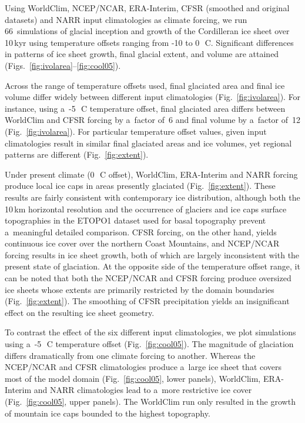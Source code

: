 \documentclass[tc, ms]{copernicus}
\begin{document}
Using WorldClim, NCEP/NCAR, ERA-Interim, CFSR (smoothed and original datasets) and NARR input climatologies as climate forcing, we run 66~simulations of glacial inception and growth of the Cordilleran ice sheet over 10\,kyr using temperature offsets ranging from -10 to 0\,\unit{{\degree}C}. Significant differences in patterns of ice sheet growth, final glacial extent, and volume are attained (Figs.~\ref{fig:ivolarea}--\ref{fig:cool05}).

Across the range of temperature offsets used, final glaciated area and final ice volume differ widely between different input climatologies (Fig.~\ref{fig:ivolarea}). For instance, using a~-5\,\unit{{\degree}C} temperature offset, final glaciated area differs between WorldClim and CFSR forcing by a~factor of~6 and final volume by a~factor of~12 (Fig.~\ref{fig:ivolarea}). For particular temperature offset values, given input climatologies result in similar final glaciated areas and ice volumes, yet regional patterns are different (Fig.~\ref{fig:extent}).

Under present climate (0\,\unit{{\degree}C} offset), WorldClim, ERA-Interim and NARR forcing produce local ice caps in areas presently glaciated (Fig.~\ref{fig:extent}). These results are fairly consistent with contemporary ice distribution, although both the 10\,\unit{km} horizontal resolution and the occurrence of glaciers and ice caps surface topographies in the ETOPO1 dataset used for basal topography prevent a~meaningful detailed comparison. CFSR forcing, on the other hand, yields continuous ice cover over the northern Coast Mountains, and NCEP/NCAR forcing results in ice sheet growth, both of which are largely inconsistent with the present state of glaciation. At the opposite side of the temperature offset range, it can be noted that both the NCEP/NCAR and CFSR forcing produce oversized ice sheets whose extents are primarily restricted by the domain boundaries (Fig.~\ref{fig:extent}). The smoothing of CFSR precipitation yields an insignificant effect on the resulting ice sheet geometry.

To contrast the effect of the six different input climatologies, we plot simulations using a~-5\,\unit{{\degree}C} temperature offset (Fig.~\ref{fig:cool05}). The magnitude of glaciation differs dramatically from one climate forcing to another. Whereas the NCEP/NCAR and CFSR climatologies produce a~large ice sheet that covers most of the model domain (Fig.~\ref{fig:cool05}, lower panels), WorldClim, ERA-Interim and NARR climatologies lead to a~more restrictive ice cover (Fig.~\ref{fig:cool05}, upper panels). The WorldClim run only resulted in the growth of mountain ice caps bounded to the highest topography.
\end{document}
